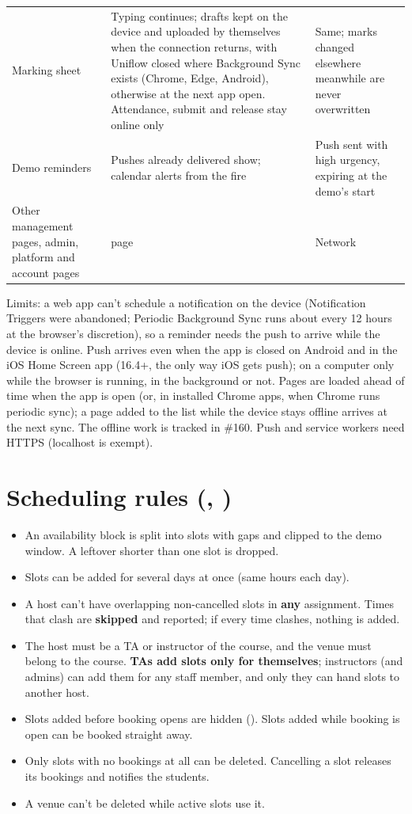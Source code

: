 {\begin{xltabular}{\linewidth}{@{}P{52mm} L L@{}}
  Marking sheet & Typing continues; drafts kept on the device and uploaded by themselves when the connection returns, with Uniflow closed where Background Sync exists (Chrome, Edge, Android), otherwise at the next app open. Attendance, submit and release stay online only & Same; marks changed elsewhere meanwhile are never overwritten\\
  Demo reminders & Pushes already delivered show; calendar alerts from the  fire & Push sent with high urgency, expiring at the demo's start\\
  Other management pages, admin, platform and account pages &  page & Network\\
  \bottomrule
\end{xltabular}}

Limits: a web app can't schedule a notification on the device (Notification Triggers were abandoned; Periodic Background Sync runs about every 12 hours at the browser's discretion), so a reminder needs the push to arrive while the device is online. Push arrives even when the app is closed on Android and in the iOS Home Screen app (16.4+, the only way iOS gets push); on a computer only while the browser is running, in the background or not. Pages are loaded ahead of time when the app is open (or, in installed Chrome apps, when Chrome runs periodic sync); a page added to the list while the device stays offline arrives at the next sync. The offline work is tracked in \#160. Push and service workers need HTTPS (localhost is exempt).

\section[Scheduling rules]{Scheduling rules (, )}

\begin{itemize}
  \item An availability block is split into  slots with  gaps and clipped to the demo window. A leftover shorter than one slot is dropped.
  \item Slots can be added for several days at once (same hours each day).
  \item A host can't have overlapping non-cancelled slots in \textbf{any} assignment. Times that clash are \textbf{skipped} and reported; if every time clashes, nothing is added.
  \item The host must be a TA or instructor of the course, and the venue must belong to the course. \textbf{TAs add slots only for themselves}; instructors (and admins) can add them for any staff member, and only they can hand slots to another host.
  \item Slots added before booking opens are hidden (). Slots added while booking is open can be booked straight away.
  \item Only slots with no bookings at all can be deleted. Cancelling a slot releases its bookings and notifies the students.
  \item A venue can't be deleted while active slots use it.
\end{itemize}

